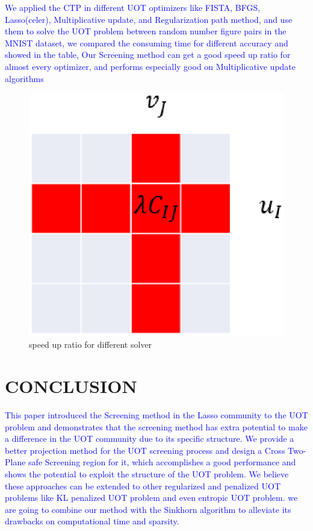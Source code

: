 \documentclass[twoside]{article}
\theoremstyle{plain}
\newcommand{\changeXS}[1]{\textcolor{blue}{#1}}
\begin{document}
\changeXS{We applied the CTP in different UOT optimizers like FISTA, BFGS, Lasso(celer), Multiplicative update, and Regularization path method, and use them to solve the UOT problem between random number figure pairs in the MNIST dataset, we compared the consuming time for different accuracy and showed in the table, Our Screening method can get a good speed up ratio for almost every optimizer, and performs especially good on Multiplicative update algorithms}
	\begin{figure}[h]
	\begin{center}	
	\includegraphics[width = \linewidth]{pic/divide}
	\caption{speed up ratio for different solver}
	\end{center}	
	\end{figure}



\section{CONCLUSION}
\changeXS{This paper introduced the Screening method in the Lasso community to the UOT problem and demonstrates that the screening method has extra potential to make a difference in the UOT community due to its specific structure. We provide a better projection method for the UOT screening process and design a Cross Two-Plane safe Screening region for it, which accomplishes a good performance and shows the potential to exploit the structure of the UOT problem. We believe these approaches can be extended to other regularized and penalized UOT problems like KL penalized UOT \citep{Dantas_ICASSP_2021} problem and even entropic UOT problem. we are going to combine our method with the Sinkhorn algorithm to alleviate its drawbacks on computational time and sparsity.}
\end{document}
